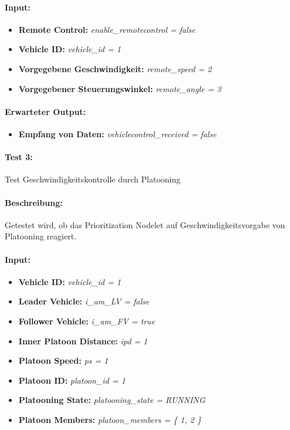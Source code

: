 \documentclass[a4paper, 12pt, titlepage]{scrartcl}
\begin{document}
				\paragraph{Input:}
				\begin{itemize} \itemsep-0.5em
					\item \textbf{Remote Control:} \emph{enable\_remotecontrol = false}
					\item \textbf{Vehicle ID:} \emph{vehicle\_id = 1}
					\item \textbf{Vorgegebene Geschwindigkeit:} \emph{remote\_speed = 2}
					\item \textbf{Vorgegebener Steuerungswinkel:} \emph{remote\_angle = 3}
				\end{itemize}
				\paragraph{Erwarteter Output:}
				\begin{itemize} \itemsep-0.5em
					\item \textbf{Empfang von Daten:} \emph{vehiclecontrol\_received = false}
				\end{itemize} 			
							
				\paragraph{Test 3:} {Test Geschwindigkeitskontrolle durch Platooning}
				\paragraph{Beschreibung:} Getestet wird, ob das Prioritization Nodelet auf Geschwindigkeitsvorgabe von Platooning reagiert. 
				\paragraph{Input:}
				\begin{itemize} \itemsep-0.5em
					\item \textbf{Vehicle ID:} \emph{vehicle\_id = 1}
					\item \textbf{Leader Vehicle:} \emph{i\_am\_LV = false}
					\item \textbf{Follower Vehicle:} \emph{i\_am\_FV = true}
					\item \textbf{Inner Platoon Distance:} \emph{ipd = 1}
					\item \textbf{Platoon Speed:} \emph{ps = 1}
					\item \textbf{Platoon ID:} \emph{platoon\_id = 1}
					\item \textbf{Platooning State:} \emph{platooning\_state = RUNNING}
					\item \textbf{Platoon Members:} \emph{platoon\_members = \{ 1, 2 \}}			
				\end{itemize}
\end{document}
